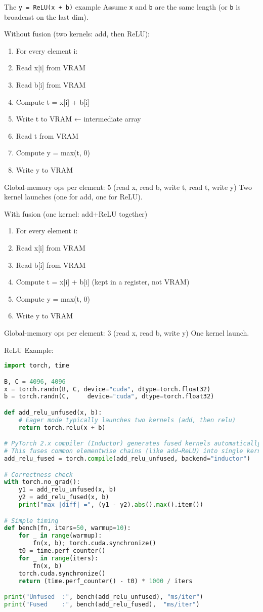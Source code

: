 \begin{commentbox}{The \texttt{y = ReLU(x + b)} example}
Assume \texttt{x} and \texttt{b} are the same length (or \texttt{b} is broadcast on the last dim).

Without fusion (two kernels: add, then ReLU):
\begin{enumerate}
	\item For every element i:
	\item Read x[i] from VRAM
	\item Read b[i] from VRAM
	\item Compute t = x[i] + b[i]
	\item Write t to VRAM ← intermediate array
	\item Read t from VRAM
	\item Compute y = max(t, 0)
	\item Write y to VRAM
\end{enumerate}
Global-memory ops per element: 5 (read x, read b, write t, read t, write y)
Two kernel launches (one for add, one for ReLU).

With fusion (one kernel: add+ReLU together)
\begin{enumerate}
	\item For every element i:
	\item Read x[i] from VRAM
	\item Read b[i] from VRAM
	\item Compute t = x[i] + b[i] (kept in a register, not VRAM)
	\item Compute y = max(t, 0)
	\item Write y to VRAM
\end{enumerate}
Global-memory ops per element: 3 (read x, read b, write y)
One kernel launch.
\end{commentbox}

ReLU Example:
\begin{lstlisting}[language=Python]
import torch, time

B, C = 4096, 4096
x = torch.randn(B, C, device="cuda", dtype=torch.float32)
b = torch.randn(C,     device="cuda", dtype=torch.float32)

def add_relu_unfused(x, b):
    # Eager mode typically launches two kernels (add, then relu)
    return torch.relu(x + b)

# PyTorch 2.x compiler (Inductor) generates fused kernels automatically
# This fuses common elementwise chains (like add→ReLU) into single kernels.
add_relu_fused = torch.compile(add_relu_unfused, backend="inductor")

# Correctness check
with torch.no_grad():
    y1 = add_relu_unfused(x, b)
    y2 = add_relu_fused(x, b)
    print("max |diff| =", (y1 - y2).abs().max().item())

# Simple timing
def bench(fn, iters=50, warmup=10):
    for _ in range(warmup):
        fn(x, b); torch.cuda.synchronize()
    t0 = time.perf_counter()
    for _ in range(iters):
        fn(x, b)
    torch.cuda.synchronize()
    return (time.perf_counter() - t0) * 1000 / iters

print("Unfused  :", bench(add_relu_unfused), "ms/iter")
print("Fused    :", bench(add_relu_fused),  "ms/iter")
\end{lstlisting}


